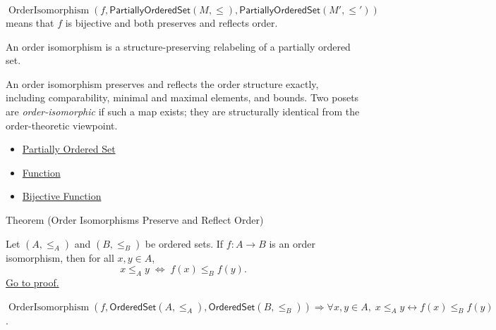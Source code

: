 \begin{remark*}
\[
\operatorname{OrderIsomorphism}(f,\mathsf{PartiallyOrderedSet}(M,\leq),
\mathsf{PartiallyOrderedSet}(M',\leq'))
\]
  means that
\(f\) is bijective and both
preserves and reflects order.
\end{remark*}

\begin{remark*}[Interpretation]
An order isomorphism is a structure-preserving relabeling of a partially
ordered set.
\end{remark*}

\begin{remark*}[Exposition]
An order isomorphism preserves and reflects the order structure exactly,
including comparability, minimal and maximal elements, and bounds. Two posets
are \emph{order-isomorphic} if such a map exists; they are structurally
identical from the order-theoretic viewpoint.
\end{remark*}

\begin{dependencies}
\begin{itemize}
  \item \hyperref[def:partially-ordered-set]{Partially Ordered Set}
  \item \hyperref[def:function]{Function}
  \item \hyperref[def:bijective]{Bijective Function}
\end{itemize}
\end{dependencies}

\begin{theorembox}{Theorem (Order Isomorphisms Preserve and Reflect Order)}
\begin{theorem}\label{thm:order-isomorphisms-preserve-and-reflect-order}
Let $(A,\leq_A)$ and $(B,\leq_B)$ be ordered sets. If $f:A\to B$ is an order
isomorphism, then for all $x,y\in A$,
\[
x\leq_A y \;\Longleftrightarrow\; f(x)\leq_B f(y).
\]
\hyperref[prf:order-isomorphisms-preserve-and-reflect-order]{Go to proof.}
\end{theorem}
\end{theorembox}

\begin{remark*}
$\operatorname{OrderIsomorphism}(f,\mathsf{OrderedSet}(A,\leq_A),
\mathsf{OrderedSet}(B,\leq_B))\Rightarrow
\forall x,y\in A,\;x\leq_A y\leftrightarrow f(x)\leq_B f(y)$.
\end{remark*}

